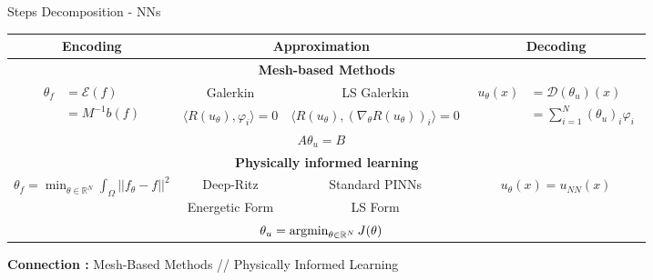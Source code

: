 \begin{frame}{Steps Decomposition - NNs}
	\vspace{10pt}
	\small
	\renewcommand{\arraystretch}{1.3}
	\begin{tabular}{|c|c|c|c|}
		\hline
		\textbf{Encoding} & \multicolumn{2}{c|}{\textbf{Approximation}} & \textbf{Decoding} \\
		\hline
		\multicolumn{4}{|c|}{\textbf{Mesh-based Methods}} \\
		\hline
		\multirow{3}{*}{$\begin{aligned}
				\theta_f&=\mathcal{E}(f) \\
				&=M^{-1}b(f)
			\end{aligned}$} & Galerkin & LS Galerkin & \multirow{3}{*}{$\begin{aligned}
				u_\theta(x)&=\mathcal{D}(\theta_u)(x) \\
				&=\sum_{i=1}^N (\theta_u)_i\varphi_i
			\end{aligned}$} \\
		 & \footnotesize $\langle R(u_\theta),\varphi_i\rangle=0$ & \footnotesize $\langle R(u_\theta),(\nabla_\theta R(u_\theta))_i\rangle=0$ & \\
		\cline{2-3}
		 & \multicolumn{2}{c|}{$A\theta_u=B$} & \\
		\hline
		\multicolumn{4}{|c|}{\textbf{Physically informed learning}} \\
		\hline
		\multirow{3}{*}{\footnotesize $\displaystyle\theta_f=\min_{\theta\in\mathbb{R}^N} \int_\Omega ||f_\theta-f||^2$} & Deep-Ritz & Standard PINNs & \multirow{3}{*}{$u_\theta(x)=u_{NN}(x)$} \\
		 & \footnotesize Energetic Form & \footnotesize LS Form & \\
		\cline{2-3}
		 & \multicolumn{2}{c|}{$\theta_u=\operatorname*{argmin}_{\theta\in \mathbb{R}^N} J(\theta)$} & \\
		\hline
	\end{tabular}

	\vspace{10pt}

	\textbf{Connection :} \qquad Mesh-Based Methods \hspace{5pt} // \hspace{5pt} Physically Informed Learning
\end{frame}

